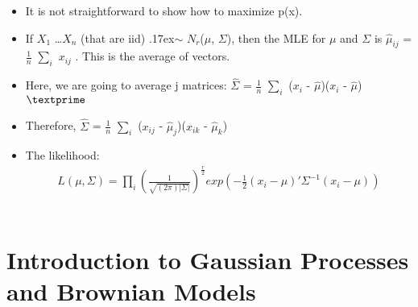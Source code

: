 \documentclass[12pt]{report}
\begin{document}
\begin{itemize}

\item It is not straightforward to show how to maximize p(x).

\item If $X_{1}$ \ldots $X_{n}$ (that are iid) {\raise.17ex\hbox{$\scriptstyle\sim$}} $N_{r}$($\mu$, $\Sigma$), then the MLE for $\mu$ and $\Sigma$ is $\hat{\mu}_{ij}$ = $\frac{1}{n}$ $\sum\limits_{i}$ $x_{ij}$ . This is the average of vectors. 

\item Here, we are going to average j matrices: $\hat{\Sigma}$ = $\frac{1}{n}$ $\sum\limits_{i}$ (\underline{$x_{i}$} - \underline{$\hat{\mu}$})(\underline{$x_{i}$}  - \underline{$\hat{\mu}$})$\textprime$

\item Therefore, $\hat{\Sigma}$ = $\frac{1}{n}$ $\sum\limits_{i}$ ($x_{ij}$ - $\hat{\mu}_{j}$)(\underline{$x_{ik}$}  - $\hat{\mu}_{k}$)

\item The likelihood:  \begin{eqnarray}
L(\mu, \Sigma) = \prod_{i} (\frac{1}{\sqrt{(2\pi)|\Sigma|}})^{\frac{r}{2}} exp(-\frac{1}{2}(x_{i}-\mu)'\Sigma^{-1}(x_{i}-\mu))
\end{eqnarray}
\\

\end{itemize}

\section{Introduction to Gaussian Processes and Brownian Models}
\end{document}
